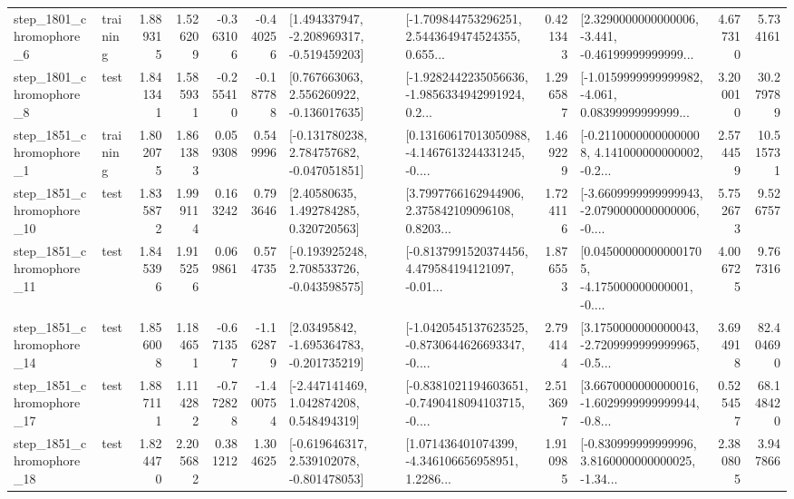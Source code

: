 \begin{tabular}{llrrrrllrlrr}
  step\_1801\_chromophore\_6 &  training &      1.889315 &    1.526209 &     -0.363106 & -0.440256 &   [1.494337947, -2.208969317, -0.519459203] &  [-1.709844753296251, 2.5443649474524355, 0.655... &       0.421343 &  [2.3290000000000006, -3.441, -0.46199999999999... &            4.677310 &          5.734161 \\
  step\_1801\_chromophore\_8 &      test &      1.841341 &    1.585931 &     -0.255410 & -0.187788 &    [0.767663063, 2.556260922, -0.136017635] &  [-1.9282442235056636, -1.9856334942991924, 0.2... &       1.296587 &  [-1.0159999999999982, -4.061, 0.08399999999999... &            3.200010 &         30.279789 \\
  step\_1851\_chromophore\_1 &  training &      1.802075 &    1.861383 &      0.059308 &  0.549996 &   [-0.131780238, 2.784757682, -0.047051851] &  [0.13160617013050988, -4.1467613244331245, -0.... &       1.469229 &  [-0.21100000000000008, 4.141000000000002, -0.2... &            2.574459 &         10.515731 \\
 step\_1851\_chromophore\_10 &      test &      1.835872 &    1.999114 &      0.163242 &  0.793646 &      [2.40580635, 1.492784285, 0.320720563] &  [3.7997766162944906, 2.375842109096108, 0.8203... &       1.724116 &  [-3.6609999999999943, -2.0790000000000006, -0.... &            5.752673 &          9.526757 \\
 step\_1851\_chromophore\_11 &      test &      1.845396 &    1.915256 &      0.069861 &  0.574735 &   [-0.193925248, 2.708533726, -0.043598575] &  [-0.8137991520374456, 4.479584194121097, -0.01... &       1.876553 &  [0.045000000000001705, -4.175000000000001, -0.... &            4.006725 &          9.767316 \\
 step\_1851\_chromophore\_14 &      test &      1.856008 &    1.184651 &     -0.671357 & -1.162879 &    [2.03495842, -1.695364783, -0.201735219] &  [-1.0420545137623525, -0.8730644626693347, -0.... &       2.794144 &  [3.1750000000000043, -2.7209999999999965, -0.5... &            3.694918 &         82.404690 \\
 step\_1851\_chromophore\_17 &      test &      1.887111 &    1.114282 &     -0.772828 & -1.400754 &    [-2.447141469, 1.042874208, 0.548494319] &  [-0.8381021194603651, -0.7490418094103715, -0.... &       2.513697 &  [3.6670000000000016, -1.6029999999999944, -0.8... &            0.525457 &         68.148420 \\
 step\_1851\_chromophore\_18 &      test &      1.824470 &    2.205682 &      0.381212 &  1.304625 &   [-0.619646317, 2.539102078, -0.801478053] &  [1.071436401074399, -4.346106656958951, 1.2286... &       1.910985 &  [-0.830999999999996, 3.8160000000000025, -1.34... &            2.380805 &          3.947866 \\

\end{tabular}
